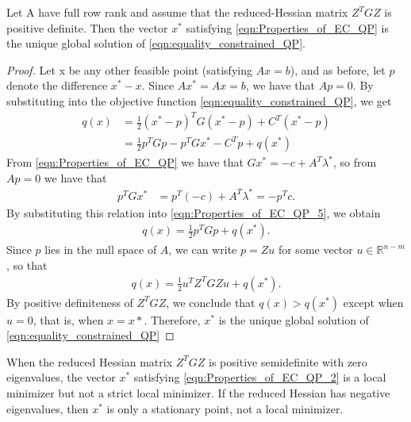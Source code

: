 \begin{theorem}
	Let A have full row rank and assume that the reduced-Hessian matrix $Z^TGZ$ is positive definite. Then the vector $x^*$ satisfying \ref{eqn:Properties_of_EC_QP} is the unique global solution of \ref{eqn:equality_constrained_QP}.
\end{theorem}
\begin{proof}
	Let x be any other feasible point (satisfying $Ax=b$), and as before, let $p$ denote the difference $x^*-x$. Since $Ax^*=Ax=b$, we have that $Ap=0$. By substituting into the objective function \ref{eqn:equality_constrained_QP}, we get
	\begin{equation}
	\begin{aligned}
		q(x) & = \frac{1}{2}(x^*-p)^TG(x^*-p)+C^T(x^*-p)\\
		& = \frac{1}{2}p^TGp-p^TGx^*-C^Tp+q(x^*)
	\end{aligned}
	\label{eqn:Properties_of_EC_QP_5}
	\end{equation}
	From \ref{eqn:Properties_of_EC_QP} we have that $Gx^*=-c+A^T\lambda^*$, so from $Ap = 0$ we have that
	\begin{equation}
	\begin{aligned}
		p^TGx^* &= p^T(-c)+A^T\lambda^* = -p^Tc.
	\end{aligned}
	\label{eqn:Properties_of_EC_QP_6}
	\end{equation}
	By substituting this relation into \ref{eqn:Properties_of_EC_QP_5}, we obtain
	\begin{equation}
	\begin{aligned}
		q(x)= \frac{1}{2} p^TGp + q(x^*).
	\end{aligned}
	\label{eqn:Properties_of_EC_QP_7}
	\end{equation}
	Since $p$ lies in the null space of $A$, we can write $p=Zu$ for some vector $u\in \mathbb{R}^{n-m}$, so that
	\begin{equation}
	\begin{aligned}
		q(x)= \frac{1}{2} u^TZ^TGZu + q(x^*).
	\end{aligned}
	\label{eqn:Properties_of_EC_QP_8}
	\end{equation}
	By positive definiteness of $Z^TGZ$, we conclude that $q(x)>q(x^*)$ except when $u=0$, that is, when $x=x*$. Therefore, $x^*$ is the unique global solution of \ref{eqn:equality_constrained_QP}
\end{proof}

When the reduced Hessian matrix $Z^TGZ$ is positive semidefinite with zero eigenvalues, the vector $x^*$ satisfying \ref{eqn:Properties_of_EC_QP_2} is a local minimizer but not a strict local minimizer. If the reduced Hessian has negative eigenvalues, then $x^*$ is only a stationary point, not a local minimizer.

